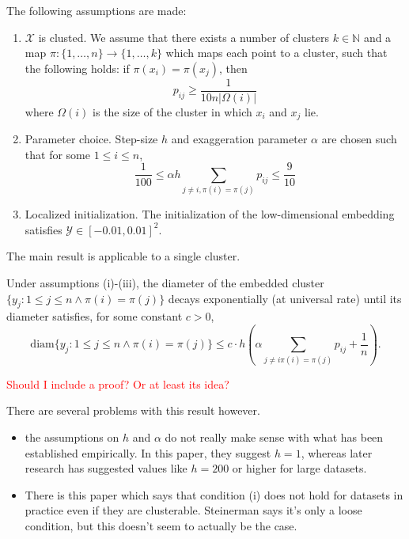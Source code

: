 The following assumptions are made: 
\begin{enumerate}
    \item $\mathcal{X}$ is clusted. We assume that there exists a number of clusters $k \in \mathbb{N}$ and a map $\pi: \{1,\dots,n\} \to \{1,\dots,k\}$ which maps each point to a cluster, such that the following holds: if $\pi(x_i) = \pi(x_j)$, then \begin{equation}
    \label{eq:4.1}
        p_{ij} \geq \frac{1}{10 n |\Omega(i)|}
    \end{equation}
    where $\Omega(i)$ is the size of the cluster in which $x_i$ and $x_j$ lie. 
    \item Parameter choice. Step-size $h$ and exaggeration parameter $\alpha$ are chosen such that for some $1\leq i \leq n$, 
    \begin{equation}
        \frac{1}{100} \leq \alpha h \sum_{j \neq i, \pi(i) = \pi(j)} p_{ij} \leq \frac{9}{10}
    \end{equation}
    \item Localized initialization. The initialization of the low-dimensional embedding satisfies $\mathcal{Y} \in [-0.01, 0.01]^2$. 
\end{enumerate}
The main result is applicable to a single cluster. 

\begin{thm}
    Under assumptions (i)-(iii), the diameter of the embedded cluster $\{y_j: 1 \leq j \leq n \land \pi(i) = \pi(j)\}$ decays exponentially (at universal rate) until its diameter satisfies, for some constant $c > 0$,
    \begin{equation}
        \text{diam} \{y_j: 1 \leq j \leq n \land \pi(i) = \pi(j)\} \leq c \cdot h \left(\alpha \sum_{j \neq i \pi(i) = \pi(j)} p_{ij} + \frac{1}{n} \right). 
    \end{equation}
\end{thm}
\textcolor{red}{Should I include a proof? Or at least its idea?}

There are several problems with this result however. 
\begin{itemize}
    \item the assumptions on $h$ and $\alpha$ do not really make sense with what has been established empirically. In this paper, they suggest $h=1$, whereas later research has suggested values like $h=200$ or higher for large datasets. 
    \item There is this paper which says that condition (i) does not hold for datasets in practice even if they are clusterable. Steinerman says it's only a loose condition, but this doesn't seem to actually be the case. 
\end{itemize}

